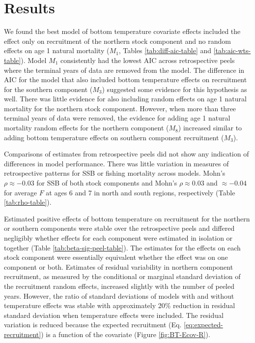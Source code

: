 \documentclass[
]{article}
\begin{document}
\hypertarget{results}{%
\section*{Results}\label{results}}

We found the best model of bottom temperature covariate effects included the effect only on recruitment of the northern stock component and no random effects on age 1 natural mortality (\(M_1\), Tables \ref{tab:diff-aic-table} and \ref{tab:aic-wts-table}). Model \(M_1\) consistently had the lowest AIC across retrospective peels where the terminal years of data are removed from the model. The difference in AIC for the model that also included bottom temperature effects on recruitment for the southern component (\(M_3\)) suggested some evidence for this hypothesis as well. There was little evidence for also including random effects on age 1 natural mortality for the northern stock component. However, when more than three terminal years of data were removed, the evidence for adding age 1 natural mortality random effects for the northern component (\(M_8\)) increased similar to adding bottom temperature effects on southern component recruitment (\(M_3\)).

Comparisons of estimates from retrospective peels did not show any indication of differences in model performance. There was little variation in measures of retrospective patterns for SSB or fishing mortality across models. Mohn's \(\rho \approx -0.03\) for SSB of both stock components and Mohn's \(\rho \approx 0.03\) and \(\approx -0.04\) for average \(F\) at ages 6 and 7 in north and south regions, respectively (Table \ref{tab:rho-table}).

Estimated positive effects of bottom temperature on recruitment for the northern or southern components were stable over the retrospective peels and differed negligibly whether effects for each component were estimated in isolation or together (Table \ref{tab:beta-sig-peel-table}). The estimates for the effects on each stock component were essentially equivalent whether the effect was on one component or both. Estimates of residual variability in northern component recruitment, as measured by the conditional or marginal standard deviation of the recruitment random effects, increased slightly with the number of peeled years. However, the ratio of standard deviations of models with and without temperature effects was stable with approximately 20\% reduction in residual standard deviation when temperature effects were included. The residual variation is reduced because the expected recruitment (Eq. \ref{eq:expected-recruitment}) is a function of the covariate (Figure \ref{fig:BT-Ecov-R}).
\end{document}
